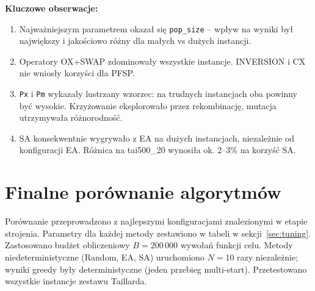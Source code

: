 \documentclass[11pt,a4paper]{article}
\begin{document}
\textbf{Kluczowe obserwacje:}
\begin{enumerate}
    \item Najważniejszym parametrem okazał się \texttt{pop\_size} -- wpływ na wyniki był największy i jakościowo różny dla małych vs dużych instancji.
    \item Operatory OX+SWAP zdominowały wszystkie instancje. INVERSION i CX nie wniosły korzyści dla PFSP.
    \item \texttt{Px} i \texttt{Pm} wykazały lustrzany wzorzec: na trudnych instancjach oba powinny być wysokie. Krzyżowanie eksplorowało przez rekombinację, mutacja utrzymywała różnorodność.
    \item SA konsekwentnie wygrywało z EA na dużych instancjach, niezależnie od konfiguracji EA. Różnica na tai500\_20 wynosiła ok. 2--3\% na korzyść SA.
\end{enumerate}

\clearpage
\section{Finalne porównanie algorytmów}
\label{sec:final}

Porównanie przeprowadzono z najlepszymi konfiguracjami znalezionymi w etapie strojenia. Parametry dla każdej metody zestawiono w tabeli w sekcji~\ref{sec:tuning}. Zastosowano budżet obliczeniowy $B = 200\,000$ wywołań funkcji celu. Metody niedeterministyczne (Random, EA, SA) uruchomiono $N = 10$ razy niezależnie; wyniki greedy były deterministyczne (jeden przebieg multi-start). Przetestowano wszystkie instancje zestawu Taillarda.

\begin{table}[H]
\centering
\caption{Finalne porównanie -- wyniki z 10 uruchomień ($B = 200\,000$)}
\end{table}
\end{document}
